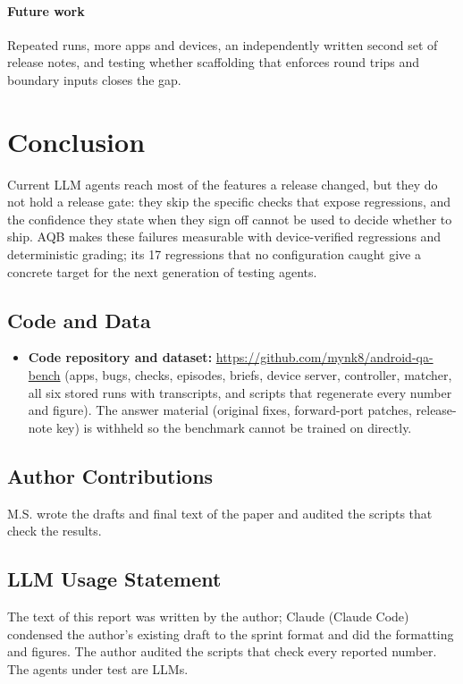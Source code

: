 \documentclass[10pt,letterpaper]{article}
\newcommand{\aqb}{AQB\xspace}
\begin{document}
\paragraph{Future work}
Repeated runs, more apps and devices, an independently
written second set of release notes, and testing whether scaffolding that enforces round trips and
boundary inputs closes the gap.

\section{Conclusion}
Current LLM agents reach most of the features a release changed, but they do not hold a release
gate: they skip the specific checks that expose regressions, and the confidence they state when they
sign off cannot be used to decide whether to ship. \aqb makes these failures measurable with
device-verified regressions and deterministic grading; its 17 regressions that no configuration caught
give a concrete target for the next generation of testing agents.

\subsection*{Code and Data}
\begin{itemize}
\item \textbf{Code repository and dataset:} \url{https://github.com/mynk8/android-qa-bench} (apps, bugs, checks,
  episodes, briefs, device server, controller, matcher, all six stored runs with transcripts, and scripts
  that regenerate every number and figure). The answer material (original fixes, forward-port patches,
  release-note key) is withheld so the benchmark cannot be trained on directly.
\end{itemize}

\subsection*{Author Contributions}
M.S. wrote the drafts and final text of the paper and audited the scripts that check the results.

\subsection*{LLM Usage Statement}
The text of this report was written by the author; Claude (Claude Code) condensed the author's existing
draft to the sprint format and did the formatting and figures. The author audited the
scripts that check every reported number. The agents under test are LLMs.
\end{document}
